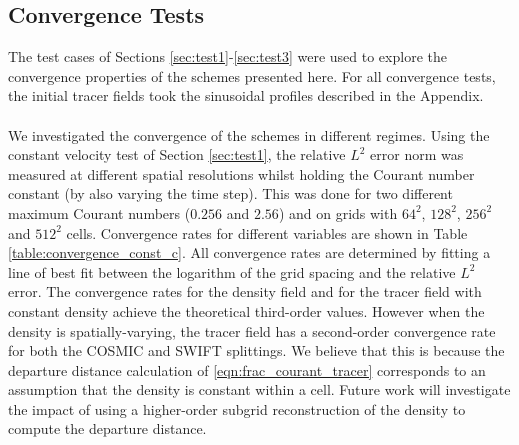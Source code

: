 \documentclass[11pt,a4paper]{article}
\begin{document}
\subsection{Convergence Tests} \label{sec:convergence}
The test cases of Sections \ref{sec:test1}-\ref{sec:test3} were used to explore the convergence properties of the schemes presented here.
For all convergence tests, the initial tracer fields took the sinusoidal profiles described in the Appendix. \\
\\
We investigated the convergence of the schemes in different regimes.
Using the constant velocity test of Section \ref{sec:test1}, the relative $L^2$ error norm was measured at different spatial resolutions whilst holding the Courant number constant (by also varying the time step).
This was done for two different maximum Courant numbers ($0.256$ and $2.56$) and on grids with $64^2$, $128^2$, $256^2$ and $512^2$ cells.
Convergence rates for different variables are shown in Table \ref{table:convergence_const_c}.
All convergence rates are determined by fitting a line of best fit between the logarithm of the grid spacing and the relative $L^2$ error.
The convergence rates for the density field and for the tracer field with constant density achieve the theoretical third-order values.
However when the density is spatially-varying, the tracer field has a second-order convergence rate for both the COSMIC and SWIFT splittings.
We believe that this is because the departure distance calculation of \eqref{eqn:frac_courant_tracer} corresponds to an assumption that the density is constant within a cell.
Future work will investigate the impact of using a higher-order subgrid reconstruction of the density to compute the departure distance.
\\
\end{document}
